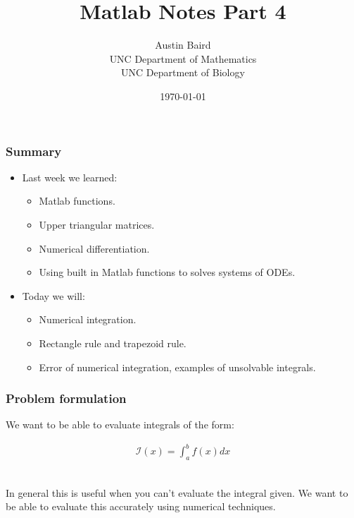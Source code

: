 \documentclass{beamer}
\title{ Matlab Notes Part 4}
\author{Austin Baird\\UNC Department of Mathematics\\UNC Department of Biology}
\date{\today}
\begin{document}
\frame{\titlepage}

\begin{frame}
\frametitle{Summary}
\begin{itemize}

\item Last week we learned: 
\begin{itemize}
\item Matlab functions. 
\item Upper triangular matrices.
\item Numerical differentiation.
\item Using built in Matlab functions to solves systems of ODEs. 
\end{itemize}
\item Today we will: 
\begin{itemize}
\item Numerical integration.
\item Rectangle rule and trapezoid rule. 
\item Error of numerical integration, examples of unsolvable integrals. 
\end{itemize}
\end{itemize}

\end{frame}

\begin{frame}
\frametitle{Problem formulation}

We want to be able to evaluate integrals of the form: 

\begin{align*}
\mathcal{I}(x) = \int^{b}_{a} f(x) dx 
\end{align*}

\ \\
In general this is useful when you can't evaluate the integral given. We want to be able to evaluate this accurately using numerical techniques. 

\end{frame}
\end{document}
